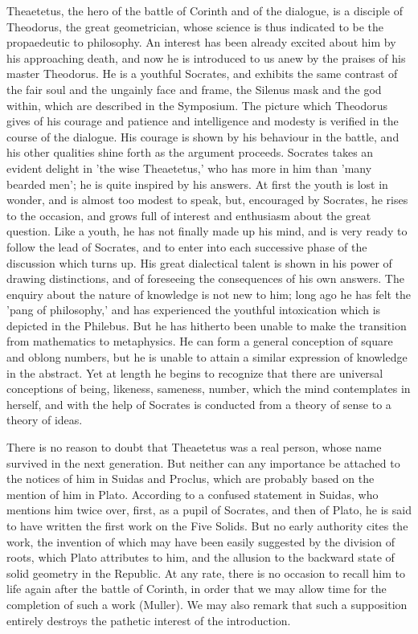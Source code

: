 Theaetetus, the hero of the battle of Corinth and of the dialogue, is
a disciple of Theodorus, the great geometrician, whose science is thus
indicated to be the propaedeutic to philosophy. An interest has been
already excited about him by his approaching death, and now he is
introduced to us anew by the praises of his master Theodorus. He is a
youthful Socrates, and exhibits the same contrast of the fair soul and
the ungainly face and frame, the Silenus mask and the god within, which
are described in the Symposium. The picture which Theodorus gives of
his courage and patience and intelligence and modesty is verified in
the course of the dialogue. His courage is shown by his behaviour in the
battle, and his other qualities shine forth as the argument proceeds.
Socrates takes an evident delight in 'the wise Theaetetus,' who has more
in him than 'many bearded men'; he is quite inspired by his answers. At
first the youth is lost in wonder, and is almost too modest to speak,
but, encouraged by Socrates, he rises to the occasion, and grows full of
interest and enthusiasm about the great question. Like a youth, he has
not finally made up his mind, and is very ready to follow the lead of
Socrates, and to enter into each successive phase of the discussion
which turns up. His great dialectical talent is shown in his power of
drawing distinctions, and of foreseeing the consequences of his own
answers. The enquiry about the nature of knowledge is not new to him;
long ago he has felt the 'pang of philosophy,' and has experienced the
youthful intoxication which is depicted in the Philebus. But he
has hitherto been unable to make the transition from mathematics to
metaphysics. He can form a general conception of square and oblong
numbers, but he is unable to attain a similar expression of knowledge
in the abstract. Yet at length he begins to recognize that there are
universal conceptions of being, likeness, sameness, number, which the
mind contemplates in herself, and with the help of Socrates is conducted
from a theory of sense to a theory of ideas.

There is no reason to doubt that Theaetetus was a real person, whose
name survived in the next generation. But neither can any importance be
attached to the notices of him in Suidas and Proclus, which are probably
based on the mention of him in Plato. According to a confused statement
in Suidas, who mentions him twice over, first, as a pupil of Socrates,
and then of Plato, he is said to have written the first work on the Five
Solids. But no early authority cites the work, the invention of which
may have been easily suggested by the division of roots, which Plato
attributes to him, and the allusion to the backward state of solid
geometry in the Republic. At any rate, there is no occasion to recall
him to life again after the battle of Corinth, in order that we may
allow time for the completion of such a work (Muller). We may also
remark that such a supposition entirely destroys the pathetic interest
of the introduction.

